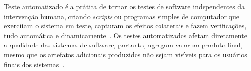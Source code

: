 Teste automatizado é a prática de tornar os testes de software independentes da
intervenção humana, criando \textit{scripts} ou programas simples de computador que exercitam 
o sistema em teste, capturam os efeitos colaterais e fazem verificações, tudo 
automática e dinamicamente~\cite{meszaros2007}.
%
Os testes automatizados afetam diretamente a qualidade dos sistemas de software,
portanto, agregam valor  ao produto final, mesmo que os artefatos adicionais
produzidos não sejam visíveis para os usuários finais dos sistemas~\cite{bernardo2011}.

